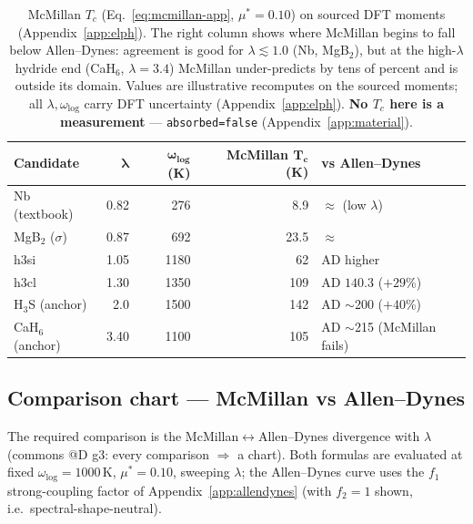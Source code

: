 \begin{table}[h]
\centering
\small
\setlength{\tabcolsep}{6pt}
\begin{tabular}{@{}lrrrl@{}}
\toprule
\textbf{Candidate} & $\boldsymbol{\lambda}$ & $\boldsymbol{\omega_{\log}}$ (K) &
\textbf{McMillan} $\boldsymbol{T_c}$ (K) & \textbf{vs Allen--Dynes} \\
\midrule
Nb (textbook)      & 0.82 & 276  & 8.9   & $\approx$ (low $\lambda$) \\
MgB$_2$ ($\sigma$) & 0.87 & 692  & 23.5  & $\approx$ \\
h3si               & 1.05 & 1180 & 62    & AD higher \\
h3cl               & 1.30 & 1350 & 109   & AD $140.3$ ($+29$\%) \\
H$_3$S (anchor)    & 2.0  & 1500 & 142   & AD $\sim$200 ($+40$\%) \\
CaH$_6$ (anchor)   & 3.40 & 1100 & 105   & AD $\sim$215 (McMillan fails) \\
\bottomrule
\end{tabular}
\caption{McMillan $T_c$ (Eq.~\ref{eq:mcmillan-app}, $\mu^{*}=0.10$) on
sourced DFT moments (Appendix~\ref{app:elph}). The right column shows where
McMillan begins to fall below Allen--Dynes: agreement is good for
$\lambda\!\lesssim\!1.0$ (Nb, MgB$_2$), but at the high-$\lambda$ hydride
end (CaH$_6$, $\lambda\!=\!3.4$) McMillan under-predicts by tens of percent
and is outside its domain. Values are illustrative recomputes on the
sourced moments; all $\lambda,\omega_{\log}$ carry DFT uncertainty
(Appendix~\ref{app:elph}). \textbf{No $T_c$ here is a measurement} ---
\texttt{absorbed=false} (Appendix~\ref{app:material}).}
\label{tab:mcmillan-recompute}
\end{table}

\subsection{Comparison chart --- McMillan vs Allen--Dynes}
\label{app:mcmillan-chart}

The required comparison is the McMillan$\leftrightarrow$Allen--Dynes
divergence with $\lambda$ (commons @D g3: every comparison $\Rightarrow$ a
chart). Both formulas are evaluated at fixed $\omega_{\log}=1000$\,K,
$\mu^{*}=0.10$, sweeping $\lambda$; the Allen--Dynes curve uses the
$f_1$ strong-coupling factor of Appendix~\ref{app:allendynes} (with
$f_2\!=\!1$ shown, i.e.\ spectral-shape-neutral).

